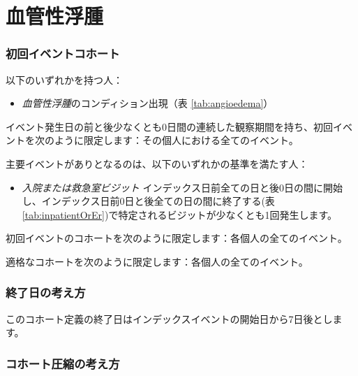 \documentclass[
  11pt]{book}
\providecommand{\tightlist}{%
  \setlength{\itemsep}{0pt}\setlength{\parskip}{0pt}}
\theoremstyle{definition}
\theoremstyle{definition}
\theoremstyle{definition}
\theoremstyle{definition}
\theoremstyle{remark}
\begin{document}
\section{血管性浮腫}\label{Angioedema}

\subsubsection*{初回イベントコホート}\label{ux521dux56deux30a4ux30d9ux30f3ux30c8ux30b3ux30dbux30fcux30c8-3}

以下のいずれかを持つ人：

\begin{itemize}
\tightlist
\item
  \emph{血管性浮腫}のコンディション出現（表 \ref{tab:angioedema}）
\end{itemize}

イベント発生日の前と後少なくとも0日間の連続した観察期間を持ち、初回イベントを次のように限定します：その個人における全てのイベント。

主要イベントがありとなるのは、以下のいずれかの基準を満たす人：

\begin{itemize}
\tightlist
\item
  \emph{入院または救急室ビジット} インデックス日前全ての日と後0日の間に開始し、インデックス日前0日と後全ての日の間に終了する(表 \ref{tab:inpatientOrEr})で特定されるビジットが少なくとも1回発生します。
\end{itemize}

初回イベントのコホートを次のように限定します：各個人の全てのイベント。

適格なコホートを次のように限定します：各個人の全てのイベント。

\subsubsection*{終了日の考え方}\label{ux7d42ux4e86ux65e5ux306eux8003ux3048ux65b9-3}

このコホート定義の終了日はインデックスイベントの開始日から7日後とします。

\subsubsection*{コホート圧縮の考え方}\label{ux30b3ux30dbux30fcux30c8ux5727ux7e2eux306eux8003ux3048ux65b9-3}
\end{document}

